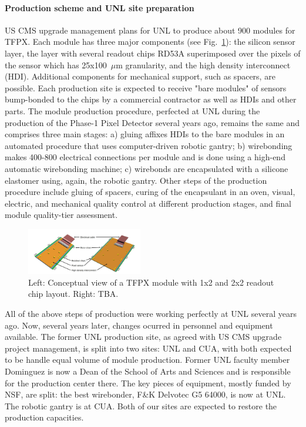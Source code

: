 \paragraph{Production scheme and UNL site preparation}

US CMS upgrade management plans for UNL to produce about 900 modules for TFPX. Each module has three major components (see Fig.~\ref{fig:TFPXmodule}): the silicon sensor layer, the layer with several readout chips RD53A superimposed over the pixels of the sensor which has 25x100~$\mu$m granularity, and the high density interconnect (HDI). Additional components for mechanical support, such as spacers, are possible. Each production site is expected to receive "bare modules" of sensors bump-bonded to the chips by a commercial contractor as well as HDIs and other parts. The module production procedure, perfected at UNL during the production of the Phase-1 Pixel Detector several years ago, remains the same and comprises three main stages: a) gluing affixes HDIs to the bare modules in an automated procedure that uses computer-driven robotic gantry; b) wirebonding makes 400-800 electrical connections per module and is done using a high-end automatic wirebonding machine; c) wirebonds are encapsulated with a silicone elastomer using, again, the robotic gantry. Other steps of the production procedure include gluing of spacers, curing of the encapsulant in an oven, visual, electric, and mechanical quality control at different production stages, and final module quality-tier assessment. 

\begin{figure}
\centering\includegraphics[width=0.45\textwidth]{figs/phase2_pixel_module_lowres.png}
\caption{\label{fig:TFPXmodule} Left: Conceptual view of a TFPX module with 1x2 and 2x2 readout chip layout. Right: TBA.}
\end{figure}

All of the above steps of production were working perfectly at UNL several years ago. Now, several years later, changes ocurred in personnel and equipment available. The former UNL production site, as agreed with US CMS upgrade project management, is split into two sites: UNL and CUA, with both expected to be handle equal volume of module production. Former UNL faculty member Dominguez is now a Dean of the School of Arts and Sciences and is responsible for the production center there. The key pieces of equipment, mostly funded by NSF, are split: the best wirebonder, F\&K Delvotec G5 64000, is now at UNL. The robotic gantry is at CUA. Both of our sites are expected to restore the production capacities. 

